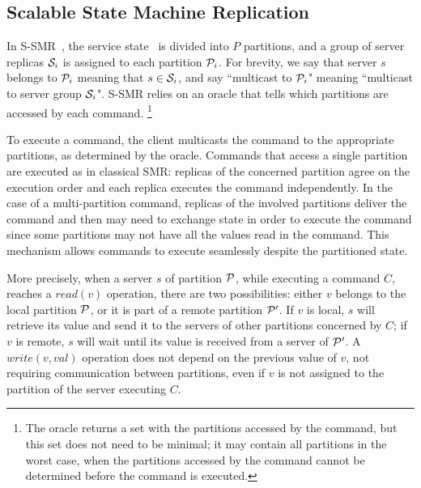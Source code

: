 \subsection{Scalable State Machine Replication}

In S-SMR~\cite{bezerra2014ssmr}, the service state \vvt\ is divided into $P$ partitions, and a group of server replicas $\mathcal{S}_i$ is assigned to each partition $\mathcal{P}_i$. For brevity, we say that server $s$ belongs to $\mathcal{P}_i$ meaning that $s \in \mathcal{S}_i$, and say ``multicast to $\mathcal{P}_i$" meaning ``multicast to server group $\mathcal{S}_i$".
S-SMR relies on an oracle that tells which partitions are accessed by each command.%
\footnote{The oracle returns a set with the partitions accessed by the command, but this set does not need to be minimal; it may contain all partitions in the worst case, when the partitions accessed by the command cannot be determined before the command is executed.}

To execute a command, the client multicasts the command to the appropriate partitions, as determined by the oracle.
Commands that access a single partition are executed as in classical SMR: replicas of the concerned partition agree on the execution order and each replica executes the command independently.
In the case of a multi-partition command, replicas of the involved partitions deliver the command and then may need to exchange state in order to execute the command since some partitions may not have all the values read in the command.
This mechanism allows commands to execute seamlessly despite the partitioned state.

More precisely, when a server $s$ of partition $\mathcal{P}$, while executing a command $C$, reaches a $read(v)$ operation, there are two possibilities: either $v$ belongs to the local partition $\mathcal{P}$, or it is part of a remote partition $\mathcal{P}'$. 
If $v$ is local, $s$ will retrieve its value and send it to the servers of other partitions concerned by $C$; if $v$ is remote, $s$ will wait until its value is received from a server of $\mathcal{P}'$. 
A $write(v, val)$ operation does not depend on the previous value of $v$, not requiring communication between partitions, even if $v$ is not assigned to the partition of the server executing $C$. 

